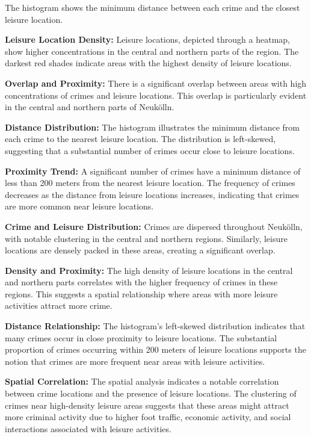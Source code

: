 \begin{figure}[h]
\begin{subfigure}[b]{0.45\textwidth}
        \caption{}
        \label{fig:image2}
    \end{subfigure}

\end{figure}
The histogram shows the minimum distance between each crime and the closest leisure location. 

\textbf{Leisure Location Density:} Leisure locations, depicted through a heatmap, show higher concentrations in the central and northern parts of the region. The darkest red shades indicate areas with the highest density of leisure locations. 

\textbf{Overlap and Proximity:} There is a significant overlap between areas with high concentrations of crimes and leisure locations. This overlap is particularly evident in the central and northern parts of Neukölln. 

\textbf{Distance Distribution:} The histogram illustrates the minimum distance from each crime to the nearest leisure location. The distribution is left-skewed, suggesting that a substantial number of crimes occur close to leisure locations. 

\textbf{Proximity Trend:} A significant number of crimes have a minimum distance of less than 200 meters from the nearest leisure location. The frequency of crimes decreases as the distance from leisure locations increases, indicating that crimes are more common near leisure locations. 

\textbf{Crime and Leisure Distribution:} Crimes are dispersed throughout Neukölln, with notable clustering in the central and northern regions. Similarly, leisure locations are densely packed in these areas, creating a significant overlap. 

\textbf{Density and Proximity:} The high density of leisure locations in the central and northern parts correlates with the higher frequency of crimes in these regions. This suggests a spatial relationship where areas with more leisure activities attract more crime. 

\textbf{Distance Relationship:} The histogram's left-skewed distribution indicates that many crimes occur in close proximity to leisure locations. The substantial proportion of crimes occurring within 200 meters of leisure locations supports the notion that crimes are more frequent near areas with leisure activities. 

\textbf{Spatial Correlation:} The spatial analysis indicates a notable correlation between crime locations and the presence of leisure locations. The clustering of crimes near high-density leisure areas suggests that these areas might attract more criminal activity due to higher foot traffic, economic activity, and social interactions associated with leisure activities. 


